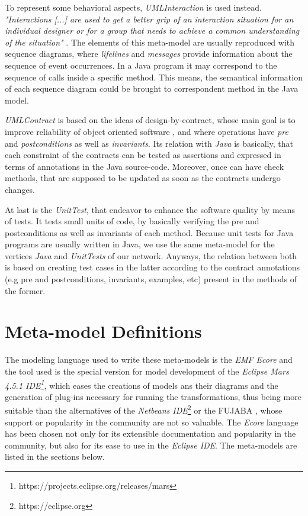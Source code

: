 \documentclass[tuberlin,cic,tc,english,noabntcite]{iiufrgs}
\begin{document}
To represent some behavioral aspects, \emph{UMLInteraction} is used instead. \emph{"Interactions [...] are used to get a better grip of an interaction situation for an individual designer or for a group that needs to achieve a common understanding of the situation"} \citep[p. 563]{omg2007unified}. The elements of this meta-model are usually reproduced with sequence diagrams, where \emph{lifelines} and \emph{messages} provide information about the sequence of event occurrences. In a Java program it may correspond to the sequence of calls inside a specific method. This means, the semantical information of each sequence diagram could be brought to correspondent method in the Java model.

\emph{UMLContract} is based on the ideas of design-by-contract, whose main goal is to improve reliability of object oriented software \citep{meyer1992applying}, and where operations have \emph{pre} and \emph{postconditions} as well as \emph{invariants}. Its relation with \emph{Java} is basically, that each constraint of the contracts can be tested as assertions and expressed in terms of annotations in the Java source-code. Moreover, once can have check methods, that are supposed to be updated as soon as the contracts undergo changes.

At last is the \emph{UnitTest}, that endeavor to enhance the software quality by means of tests. It tests small units of code, by basically verifying the pre and postconditions as well as invariants of each method. Because unit tests for Java programs are usually written in Java, we use the same meta-model for the vertices \emph{Java} and \emph{UnitTests} of our network. Anyways, the relation between both is based on creating test cases in the latter according to the contract annotations (e.g pre and postconditions, invariants, examples, etc) present in the methods of the former.

\section{Meta-model Definitions}
The modeling language used to write these meta-models is the \emph{EMF Ecore} and the tool used is the special version for model development of the \emph{Eclipse Mars 4.5.1 IDE\footnote{https://projects.eclipse.org/releases/mars}}, which eases the creations of models ans their diagrams and the generation of plug-ins necessary for running the transformations, thus being more suitable than the alternatives of the \emph{Netbeans IDE}\footnote{https://eclipse.org} or the FUJABA \citep{nickel2000fujaba}, whose support or popularity in the community are not so valuable. The \emph{Ecore} language has been chosen not only for its extensible documentation and popularity in the community, but also for its ease to use in the \emph{Eclipse IDE}. The meta-models are listed in the sections below.
\end{document}
